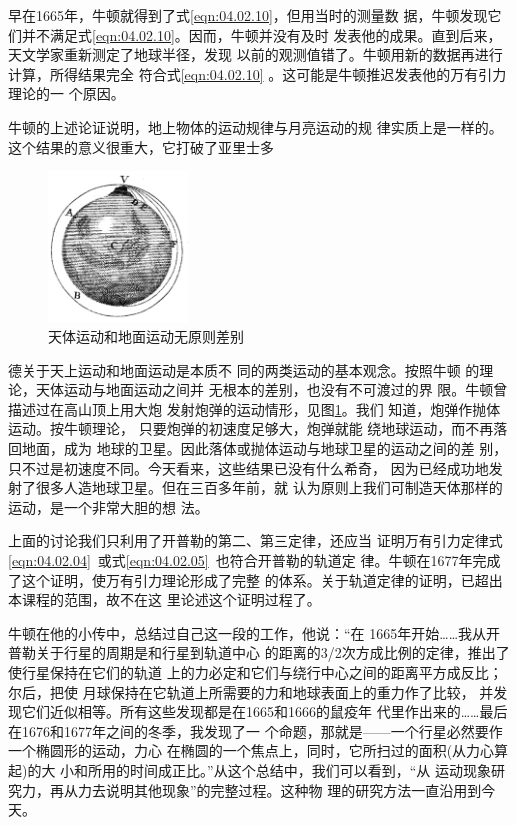 早在1665年，牛顿就得到了式\eqref{eqn:04.02.10}，但用当时的测量数
据，牛顿发现它们并不满足式\eqref{eqn:04.02.10}。因而，牛顿并没有及时
发表他的成果。直到后来，天文学家重新测定了地球半径，发现
以前的观测值错了。牛顿用新的数据再进行计算，所得结果完全
符合式\eqref{eqn:04.02.10} 。这可能是牛顿推迟发表他的万有引力理论的一
个原因。

牛顿的上述论证说明，地上物体的运动规律与月亮运动的规
律实质上是一样的。这个结果的意义很重大，它打破了亚里士多
\begin{figure}
	\centering
	\vspace{-1em}
	\includegraphics[width=10em]{figure/fig04.03}
	\caption{天体运动和地面运动无原则差别}
	\label{fig:04.03}
\end{figure}	
德关于天上运动和地面运动是本质不
同的两类运动的基本观念。按照牛顿
的理论，天体运动与地面运动之间并
无根本的差别，也没有不可渡过的界
限。牛顿曾描述过在高山顶上用大炮
发射炮弹的运动情形，见图\ref{fig:04.03}。我们
知道，炮弹作抛体运动。按牛顿理论，
只要炮弹的初速度足够大，炮弹就能
绕地球运动，而不再落回地面，成为
地球的卫星。因此落体或抛体运动与地球卫星的运动之间的差
别，只不过是初速度不同。今天看来，这些结果已没有什么希奇，
因为已经成功地发射了很多人造地球卫星。但在三百多年前，就
认为原则上我们可制造天体那样的运动，是一个非常大胆的想
法。

上面的讨论我们只利用了开普勒的第二、第三定律，还应当
证明万有引力定律式\eqref{eqn:04.02.04}~或式\eqref{eqn:04.02.05}~也符合开普勒的轨道定
律。牛顿在1677年完成了这个证明，使万有引力理论形成了完整
的体系。关于轨道定律的证明，已超出本课程的范围，故不在这
里论述这个证明过程了。

牛顿在他的小传中，总结过自己这一段的工作，他说：“在
1665年开始……我从开普勒关于行星的周期是和行星到轨道中心
的距离的3/2次方成比例的定律，推出了使行星保持在它们的轨道
上的力必定和它们与绕行中心之间的距离平方成反比；尔后，把使
月球保持在它轨道上所需要的力和地球表面上的重力作了比较，
并发现它们近似相等。所有这些发现都是在1665和1666的鼠疫年
代里作出来的……最后在1676和1677年之间的冬季，我发现了一
个命题，那就是——一个行星必然要作一个椭圆形的运动，力心
在椭圆的一个焦点上，同时，它所扫过的面积(从力心算起)的大
小和所用的时间成正比。”从这个总结中，我们可以看到，“从
运动现象研究力，再从力去说明其他现象”的完整过程。这种物
理的研究方法一直沿用到今天。
